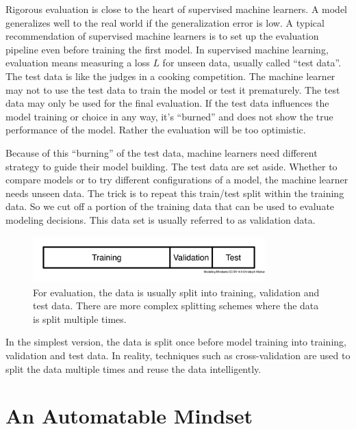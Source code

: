 \documentclass[
  10pt,
]{scrbook}
\begin{document}
Rigorous evaluation is close to the heart of supervised machine learners.
A model generalizes well to the real world if the generalization error is low.
A typical recommendation of supervised machine learners is to set up the evaluation pipeline even before training the first model.
In supervised machine learning, evaluation means measuring a loss \(L\) for unseen data, usually called ``test data''.
The test data is like the judges in a cooking competition.
The machine learner may not to use the test data to train the model or test it prematurely.
The test data may only be used for the final evaluation.
If the test data influences the model training or choice in any way, it's ``burned'' and does not show the true performance of the model.
Rather the evaluation will be too optimistic.

Because of this ``burning'' of the test data, machine learners need different strategy to guide their model building.
The test data are set aside.
Whether to compare models or to try different configurations of a model, the machine learner needs unseen data.
The trick is to repeat this train/test split within the training data.
So we cut off a portion of the training data that can be used to evaluate modeling decisions.
This data set is usually referred to as validation data.

\begin{figure}

{\centering \includegraphics[width=0.8\textwidth]{figures/evaluation-1} 

}

\caption{For evaluation, the data is usually split into training, validation and test data. There are more complex splitting schemes where the data is split multiple times.}\label{fig:evaluation}
\end{figure}

In the simplest version, the data is split once before model training into training, validation and test data.
In reality, techniques such as cross-validation are used to split the data multiple times and reuse the data intelligently.

\hypertarget{an-automatable-mindset}{%
\section{An Automatable Mindset}\label{an-automatable-mindset}}
\end{document}
